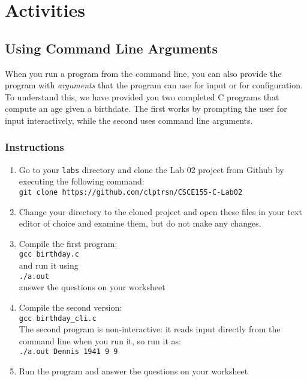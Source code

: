 \documentclass[12pt]{scrartcl}
\begin{document}
\section{Activities}

\subsection{Using Command Line Arguments}

When you run a program from the command line, you can also provide
the program with \emph{arguments} that the program can use for input
or for configuration.  To understand this, we have provided you two
completed C programs that compute an age given a birthdate.  The
first works by prompting the user for input interactively, while the second
uses command line arguments.

\subsubsection*{Instructions}

\begin{enumerate}
  \item Go to your \texttt{labs} directory and clone the Lab 02 project
  	from Github by executing the following command:\\
	\texttt{git clone https://github.com/clptrsn/CSCE155-C-Lab02}
  \item Change your directory to the cloned project and open these files in
  	your text editor of choice and examine them, but do not make any changes.
  \item Compile the first program: \\
  \texttt{gcc birthday.c} \\
  and run it using \\
  \texttt{./a.out} \\
  answer the questions on your worksheet
  \item Compile the second version: \\
  \texttt{gcc birthday_cli.c} \\
  The second program is non-interactive: it reads input directly from the
  command line when you run it, so run it as:\\
	\texttt{./a.out Dennis 1941 9 9}
  \item Run the program and answer the questions on your worksheet
\end{enumerate}
\end{document}
